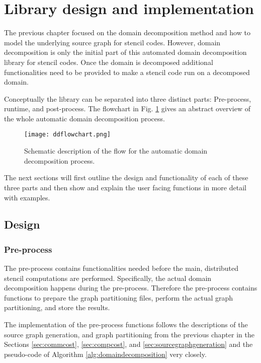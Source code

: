 \section{Library design and implementation}
The previous chapter focused on the domain decomposition method and how to model the underlying source graph for stencil codes.
However, domain decomposition is only the initial part of this automated domain decomposition library for stencil codes.
Once the domain is decomposed additional functionalities need to be provided to make a stencil code run on a decomposed domain.

Conceptually the library can be separated into three distinct parts:
Pre-process, runtime, and post-process.
The flowchart in Fig. \ref{fig:library_flowchart} gives an abstract overview of the whole automatic domain decomposition process.

\begin{figure}
\centering
\texttt{[image: ddflowchart.png]}
\caption{Schematic description of the flow for the automatic domain decomposition process.}
\label{fig:library_flowchart}
\end{figure}

The next sections will first outline the design and functionality of each of these three parts and then show and explain the user facing functions in more detail with examples.

\subsection{Design}
\subsubsection{Pre-process}
The pre-process contains functionalities needed before the main, distributed stencil computations are performed.
Specifically, the actual domain decomposition happens during the pre-process.
Therefore the pre-process contains functions to prepare the graph partitioning files, perform the actual graph partitioning, and store the results.

The implementation of the pre-process functions follows the descriptions of the source graph generation, and graph partitioning from the previous chapter in the Sections \ref{sec:commcost}, \ref{sec:compcost}, and \ref{sec:sourcegraphgeneration} and the pseudo-code of Algorithm \ref{alg:domaindecomposition} very closely.

